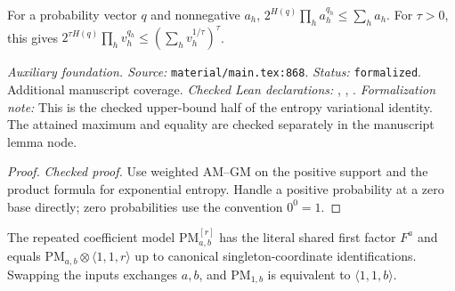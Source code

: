 \renewcommand{\thetheorem}{A71}
\begin{lemma}
\label{aux:entropy-variational-upper-bound}
\leanok
For a probability vector $q$ and nonnegative $a_h$, $2^{H(q)}\prod_h a_h^{q_h}\le\sum_h a_h$. For $\tau>0$, this gives $2^{\tau H(q)}\prod_h v_h^{q_h}\le(\sum_h v_h^{1/\tau})^\tau$.
\end{lemma}

\noindent\textit{Auxiliary foundation. Source:} \texttt{material/main.tex:868}.
\textit{Status:} \texttt{formalized}. Additional manuscript coverage.
\textit{Checked Lean declarations:} , , .
\textit{Formalization note:} This is the checked upper-bound half of the entropy variational identity. The attained maximum and equality are checked separately in the manuscript lemma node.

\begin{proof}
\leanok
{}
\textit{Checked proof.} Use weighted AM--GM on the positive support and the product formula for exponential entropy. Handle a positive probability at a zero base directly; zero probabilities use the convention $0^0=1$.
\end{proof}

\renewcommand{\thetheorem}{A72}
\begin{lemma}
\label{aux:polynomial-coordinate-models}
\leanok
The repeated coefficient model $\mathrm{PM}^{[r]}_{a,b}$ has the literal shared first factor $F^a$ and equals $\mathrm{PM}_{a,b}\otimes\langle1,1,r\rangle$ up to canonical singleton-coordinate identifications. Swapping the inputs exchanges $a,b$, and $\mathrm{PM}_{1,b}$ is equivalent to $\langle1,1,b\rangle$.
\end{lemma}

